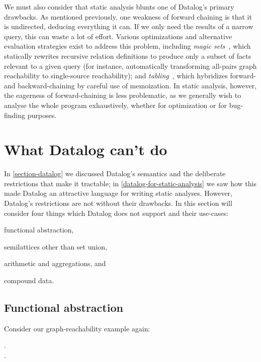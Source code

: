 \noindent
We must also consider that static analysis blunts one of Datalog's primary
drawbacks. As mentioned previously, one weakness of forward chaining is that it
is undirected, deducing everything it can. If we only need the results of a narrow query, this can waste a lot of effort.
%
Various optimizations and alternative evaluation strategies exist to address
this problem, including \emph{magic sets}~\citep{magic-sets,DBLP:conf/pods/BeeriR87}, which statically rewrites recursive relation definitions to produce only a subset of facts relevant to a given query (for instance, automatically transforming all-pairs graph reachability to single-source reachability);
%
and \emph{tabling}~\citep{DBLP:conf/sigmod/TekleL11,DBLP:journals/tplp/SwiftW12}, which hybridizes forward- and backward-chaining by careful use of memoization.
%
%
In static analysis, however, the eagerness of forward-chaining is less
problematic, as we generally wish to analyse the whole program exhaustively,
whether for optimization or for bug-finding purposes.


\section{What Datalog can't do}
\label{section-what-datalog-cannot-do}

In \cref{section-datalog} we discussed Datalog's semantics and the deliberate
restrictions that make it tractable; in \cref{datalog-for-static-analysis} we saw how this made Datalog an attractive language for writing static analyses. However, Datalog's restrictions are not without their drawbacks. In this section will consider four things which Datalog does not support and their use-cases:
\begin{enumerate*}[label=({\arabic*})]
  \item functional abstraction,
  \item semilattices other than set union,
  \item arithmetic and aggregations, and
  \item compound data.
\end{enumerate*}


\subsection{Functional abstraction}

Consider our graph-reachability example again:

\begin{datalog}
  .\\
   \gets {} \conj {}.
\end{datalog}

